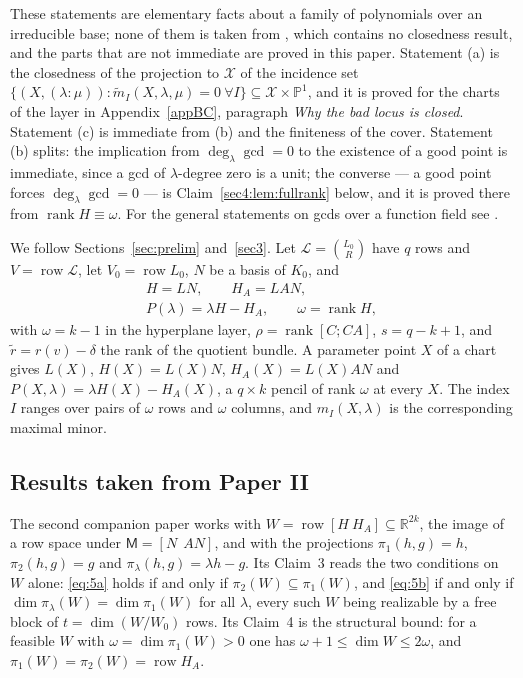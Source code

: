 \documentclass[journal]{IEEEtran}
\theoremstyle{plainn}
\theoremstyle{remark}
\newcommand{\row}{\operatorname{row}}
\newcommand{\rank}{\operatorname{rank}}
\begin{document}
These statements are elementary facts about a family of polynomials over an irreducible base; none of them
is taken from \cite{companion1}, which contains no closedness result, and the parts that are not immediate
are proved in this paper. Statement (a) is
the closedness of the projection to $\mathcal X$ of the incidence set
$\{(X,(\lambda:\mu)):\tilde m_I(X,\lambda,\mu)=0\ \forall I\}\subseteq\mathcal X\times\mathbb P^1$, and it
is proved for the charts of the layer in Appendix~\ref{appBC}, paragraph \emph{Why the bad locus is
closed}. Statement (c) is immediate from (b) and the finiteness of the cover.
Statement (b) splits: the implication from $\deg_\lambda\gcd=0$ to the existence of a good
point is immediate, since a gcd of $\lambda$-degree zero is a unit; the converse --- a good point forces
$\deg_\lambda\gcd=0$ --- is Claim~\ref{sec4:lem:fullrank} below, and it is proved there from
$\rank H\equiv\omega$. For the general statements on gcds over a function field see \cite{lan02,vzgg03}.

We follow Sections~\ref{sec:prelim} and~\ref{sec3}. Let $\mathcal L=\binom{L_0}{R}$ have $q$ rows and
$V=\row\mathcal L$, let $V_0=\row L_0$, $N$ be a basis of $K_0$, and
\[
\begin{gathered}
H=LN,\qquad H_A=LAN,\\
P(\lambda)=\lambda H-H_A,\qquad \omega=\rank H ,
\end{gathered}
\]
with $\omega=k-1$ in the hyperplane layer, $\rho=\rank[C;CA]$, $s=q-k+1$, and
$\widetilde r=r(v)-\delta$ the rank of the quotient bundle. A parameter point $X$ of a chart gives
$L(X)$, $H(X)=L(X)N$, $H_A(X)=L(X)AN$ and $P(X,\lambda)=\lambda H(X)-H_A(X)$, a $q\times k$ pencil of
rank $\omega$ at every $X$. The index $I$ ranges over pairs of $\omega$ rows and $\omega$ columns, and
$m_I(X,\lambda)$ is the corresponding maximal minor.


\subsection{Results taken from Paper II}\label{sec:prelim:assumptions}

The second companion paper \cite{companion2} works with $W=\row[H\ H_A]\subseteq\mathbb R^{2k}$, the
image of a row space under $\mathsf M=[N\ \ AN]$, and with the projections $\pi_1(h,g)=h$,
$\pi_2(h,g)=g$ and $\pi_\lambda(h,g)=\lambda h-g$. Its Claim~3 reads the two conditions on $W$ alone:
\eqref{eq:5a} holds if and only if $\pi_2(W)\subseteq\pi_1(W)$, and \eqref{eq:5b} if and only if
$\dim\pi_\lambda(W)=\dim\pi_1(W)$ for all $\lambda$, every such $W$ being realizable by a free block
of $t=\dim(W/W_0)$ rows. Its Claim~4 is the structural bound: for a feasible $W$ with
$\omega=\dim\pi_1(W)>0$ one has $\omega+1\le\dim W\le 2\omega$, and $\pi_1(W)=\pi_2(W)=\row H_A$.
\end{document}
